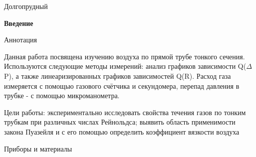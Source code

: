 \documentclass[12pt,a4paper]{article}
\begin{document}
\begin{center}
Долгопрудный 
\end{center}
\thispagestyle{empty}
\newpage
\begin{center}
\large{\bf Введение} 
\end{center}
\begin{center}
\large{Аннотация}
\end{center}
\par Данная работа посвящена изучению воздуха по прямой трубе тонкого сечения. Используются следующие методы измерений: анализ графиков зависимости Q($\Delta$P), а также линеаризированных графиков зависимостей Q(R). Расход газа измеряется с помощью газового счётчика и секундомера, перепад давления в трубке - с помощью микроманометра.
\par Цели работы: экспериментально исследовать свойства течения газов по тонким трубкам при различных числах Рейнольдса; выявить область применимости закона Пуазейля и с его помощью определить коэффициент вязкости воздуха
\hfill \break
\begin{center}
\large{Приборы и материалы}
\end{center}
\end{document}
